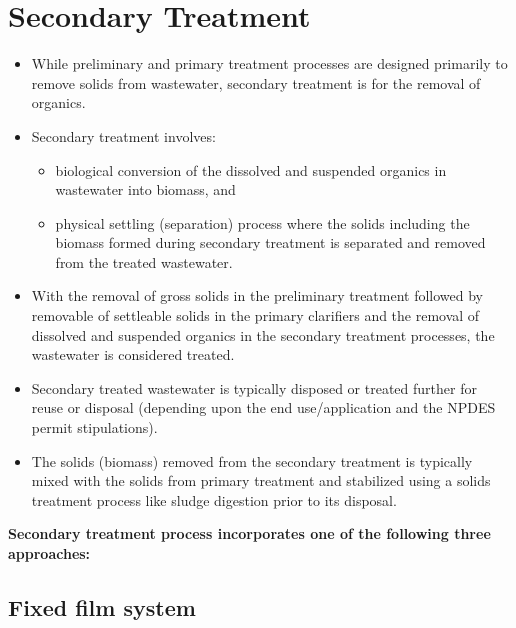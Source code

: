 \documentclass{article}
\begin{document}
\section{Secondary Treatment}
\begin{itemize}
\item While preliminary and primary treatment processes are designed primarily to remove solids from wastewater, secondary treatment is for the removal of organics.
\item Secondary treatment involves:
\begin{itemize}
\item biological conversion of the dissolved and suspended organics in wastewater into biomass, and
\item physical settling (separation) process where the solids including the biomass formed during secondary treatment is separated and removed from the treated wastewater.
\end{itemize}

\item With the removal of gross solids in the preliminary treatment followed by removable of settleable solids in the primary clarifiers and the removal of dissolved and suspended organics in the secondary treatment processes, the wastewater is considered treated.
\item Secondary treated wastewater is typically disposed or treated further for reuse or disposal (depending upon the end use/application and the NPDES permit stipulations).
\item The solids (biomass) removed from the secondary treatment is typically mixed with the solids from primary treatment and stabilized using a solids treatment process like sludge digestion prior to its disposal.
\end{itemize}
\vspace{1cm}

\textbf{Secondary treatment process incorporates one of the following three approaches:}


\subsection{Fixed film system}	
		
\end{document}
